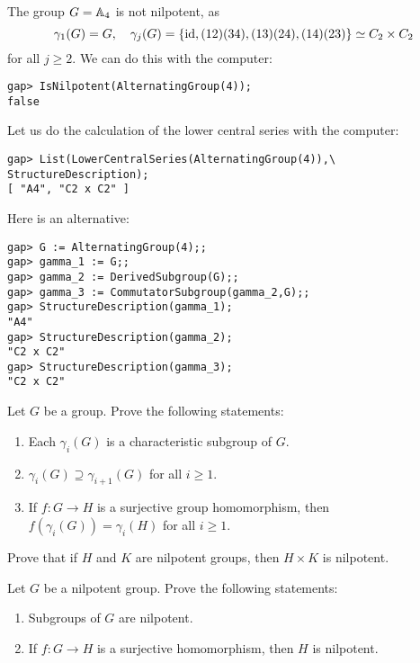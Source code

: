 \begin{example}
The group $G=\mathbb{A}_4$ is not nilpotent, as 
\[
\gamma_1(G)=G,\quad
\gamma_j(G)=\{\operatorname{id},(12)(34),(13)(24),(14)(23)\}\simeq C_2\times C_2
\]
for all $j\geq2$. We can do this with the computer:
\begin{lstlisting}
gap> IsNilpotent(AlternatingGroup(4));
false
\end{lstlisting}
Let us do the calculation of the lower central series with the computer: 
\begin{lstlisting}
gap> List(LowerCentralSeries(AlternatingGroup(4)),\
StructureDescription);
[ "A4", "C2 x C2" ]
\end{lstlisting}
Here is an alternative:
\begin{lstlisting}
gap> G := AlternatingGroup(4);;
gap> gamma_1 := G;;
gap> gamma_2 := DerivedSubgroup(G);;
gap> gamma_3 := CommutatorSubgroup(gamma_2,G);;
gap> StructureDescription(gamma_1);
"A4"
gap> StructureDescription(gamma_2);
"C2 x C2"
gap> StructureDescription(gamma_3);
"C2 x C2"
\end{lstlisting}
\end{example}

\begin{exercise}
\label{xca:gamma}
Let $G$ be a group. Prove the following statements: 
\begin{enumerate}
\item Each $\gamma_i(G)$ is a characteristic subgroup of $G$. 
\item $\gamma_i(G)\supseteq\gamma_{i+1}(G)$ for all $i\geq1$.
\item If $f\colon G\to H$ is a surjective group homomorphism, then  
$f(\gamma_i(G))=\gamma_i(H)$ for all $i\geq1$.
\end{enumerate}
\end{exercise}

\begin{exercise}
\label{xca:HxK_nilpotente}
Prove that if $H$ and $K$ are nilpotent groups, then 
$H\times K$ is nilpotent. 
\end{exercise}

\begin{exercise}
\label{xca:nilpotente}
Let $G$ be a nilpotent group. Prove the following statements: 
\begin{enumerate}
\item Subgroups of $G$ are nilpotent. 
\item If $f\colon G\to H$ is a surjective homomorphism, then $H$ is nilpotent.  
\end{enumerate}
\end{exercise}

